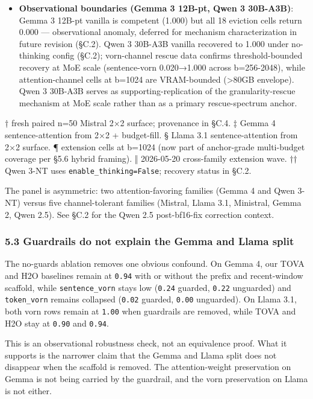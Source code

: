 \documentclass[
]{article}
\begin{document}
\begin{itemize}
  2026-05-14 reported sentence-vorn 0.96 vs sentence-TOVA 0.08 as a
  spurious vorn-favoring extreme; the differential-channel-bug
  interaction is documented in Appendix C.2.
\item
  \textbf{Observational boundaries (Gemma 3 12B-pt, Qwen 3 30B-A3B)}:
  Gemma 3 12B-pt vanilla is competent (1.000) but all 18 eviction
  cells return 0.000 — observational anomaly, deferred for mechanism
  characterization in future revision (§C.2). Qwen 3 30B-A3B vanilla
  recovered to 1.000 under no-thinking config (§C.2); vorn-channel
  rescue data confirms threshold-bounded recovery at MoE scale
  (sentence-vorn 0.020→1.000 across b=256-2048), while
  attention-channel cells at b=1024 are VRAM-bounded (>80GB envelope).
  Qwen 3 30B-A3B serves as supporting-replication of the
  granularity-rescue mechanism at MoE scale rather than as a primary
  rescue-spectrum anchor.
\end{itemize}

† fresh paired n=50 Mistral 2×2 surface; provenance in §C.4. ‡ Gemma
4 sentence-attention from 2×2 + budget-fill. § Llama 3.1
sentence-attention from 2×2 surface. ¶ extension cells at b=1024 (now
part of anchor-grade multi-budget coverage per §5.6 hybrid framing). ‖ 2026-05-20 cross-family extension wave. †† Qwen 3-NT
uses \texttt{enable\_thinking=False}; recovery status in §C.2.

The panel is asymmetric: two attention-favoring families (Gemma 4 and
Qwen 3-NT) versus five channel-tolerant families (Mistral, Llama 3.1,
Ministral, Gemma 2, Qwen 2.5). See §C.2
for the Qwen 2.5 post-bf16-fix correction context.

\subsubsection{5.3 Guardrails do not explain the Gemma and Llama
split}\label{53-guardrails-do-not-explain-the-gemma-and-llama-split}

The no-guards ablation removes one obvious confound. On Gemma 4, our
TOVA and H2O baselines remain at \texttt{0.94} with or
without the prefix and recent-window scaffold, while
\texttt{sentence\_vorn} stays low (\texttt{0.24} guarded, \texttt{0.22}
unguarded) and \texttt{token\_vorn} remains collapsed (\texttt{0.02}
guarded, \texttt{0.00} unguarded). On Llama 3.1, both vorn rows remain
at \texttt{1.00} when guardrails are removed, while
TOVA and H2O stay at \texttt{0.90} and \texttt{0.94}.

This is an observational robustness check, not an equivalence proof.
What it supports is the narrower claim that the Gemma and Llama split
does not disappear when the scaffold is removed. The attention-weight
preservation on Gemma is not being carried by the guardrail, and the
vorn preservation on Llama is not either.
\end{document}
